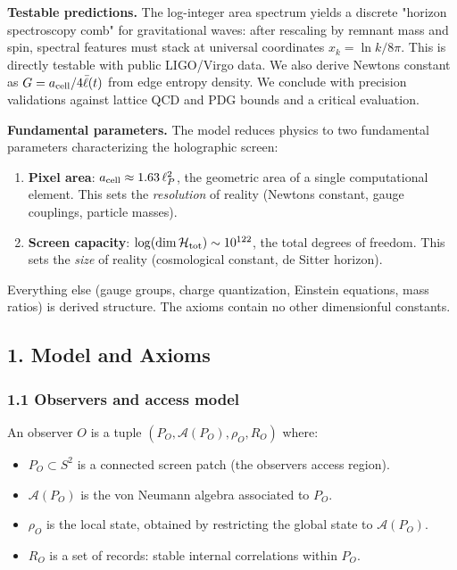 \textbf{Testable predictions.} The log-integer area spectrum yields a discrete "horizon spectroscopy comb" for gravitational waves: after rescaling by remnant mass and spin, spectral features must stack at universal coordinates \(x_k = \ln k / 8\pi\). This is directly testable with public LIGO/Virgo data. We also derive Newton\textquotesingle s constant as \(G = a_{\rm cell}/4\bar{\ell}(t)\) from edge entropy density. We conclude with precision validations against lattice QCD and PDG bounds and a critical evaluation.

\textbf{Fundamental parameters.} The model reduces physics to two fundamental parameters characterizing the holographic screen:

\begin{enumerate}
\def\labelenumi{\arabic{enumi}.}
\item
  \textbf{Pixel area}: \(a_{\rm cell} \approx 1.63\,\ell_P^2\), the geometric area of a single computational element. This sets the \emph{resolution} of reality (Newton\textquotesingle s constant, gauge couplings, particle masses).
\item
  \textbf{Screen capacity}: \(\log(\dim\mathcal{H}_{\rm tot}) \sim 10^{122}\), the total degrees of freedom. This sets the \emph{size} of reality (cosmological constant, de Sitter horizon).
\end{enumerate}

Everything else (gauge groups, charge quantization, Einstein equations, mass ratios) is derived structure. The axioms contain no other dimensionful constants.

\subsection{1. Model and Axioms}\label{1-model-and-axioms}

\subsubsection{1.1 Observers and access model}\label{11-observers-and-access-model}

An observer \(O\) is a tuple \((P_O, \mathcal{A}(P_O), \rho_O, R_O)\) where:

\begin{itemize}
\tightlist
\item
  \(P_O \subset S^2\) is a connected screen patch (the observer\textquotesingle s access region).
\item
  \(\mathcal{A}(P_O)\) is the von Neumann algebra associated to \(P_O\).
\item
  \(\rho_O\) is the local state, obtained by restricting the global state to \(\mathcal{A}(P_O)\).
\item
  \(R_O\) is a set of records: stable internal correlations within \(P_O\).
\end{itemize}

